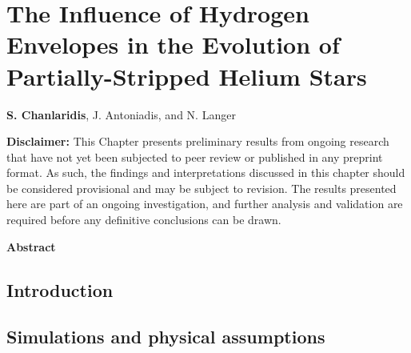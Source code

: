 \documentclass[main.tex]{subfiles}
\begin{document}
    \chapter[The Influence of Hydrogen Envelopes in the Evolution of Partially-Stripped Helium Stars]{The Influence of Hydrogen Envelopes in the Evolution of Partially-Stripped Helium Stars}

    \begin{center}
        \textbf{S. Chanlaridis}, J. Antoniadis, and N. Langer \\
    \end{center}

    \textbf{Disclaimer:} This Chapter presents preliminary results from ongoing research that have not yet been subjected to peer review or published in any preprint format. As such, the findings and interpretations discussed in this chapter should be considered provisional and may be subject to revision. The results presented here are part of an ongoing investigation, and further analysis and validation are required before any definitive conclusions can be drawn.
        
        
    \begin{center}
        \textbf{\large Abstract}
    \end{center}
    
    {
        \minitoc
        \newpage
    }
    
    \section{Introduction} \label{sec:ch4:intro}
    \section{Simulations and physical assumptions} \label{sec:ch4:methodology}
\end{document}
